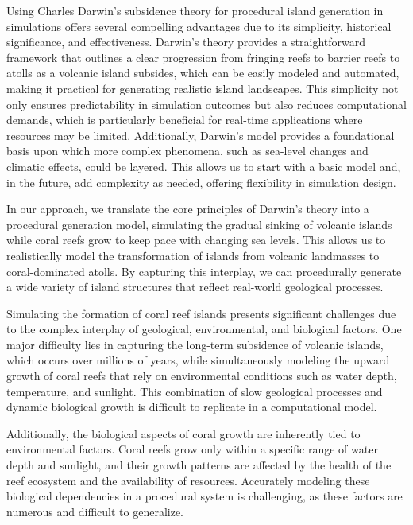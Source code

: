 Using Charles Darwin's subsidence theory for procedural island generation in simulations offers several compelling advantages due to its simplicity, historical significance, and effectiveness. Darwin's theory provides a straightforward framework that outlines a clear progression from fringing reefs to barrier reefs to atolls as a volcanic island subsides, which can be easily modeled and automated, making it practical for generating realistic island landscapes. This simplicity not only ensures predictability in simulation outcomes but also reduces computational demands, which is particularly beneficial for real-time applications where resources may be limited.
Additionally, Darwin's model provides a foundational basis upon which more complex phenomena, such as sea-level changes and climatic effects, could be layered. This allows us to start with a basic model and, in the future, add complexity as needed, offering flexibility in simulation design. 

In our approach, we translate the core principles of Darwin's theory into a procedural generation model, simulating the gradual sinking of volcanic islands while coral reefs grow to keep pace with changing sea levels. This allows us to realistically model the transformation of islands from volcanic landmasses to coral-dominated atolls. By capturing this interplay, we can procedurally generate a wide variety of island structures that reflect real-world geological processes.

%

Simulating the formation of coral reef islands presents significant challenges due to the complex interplay of geological, environmental, and biological factors. One major difficulty lies in capturing the long-term subsidence of volcanic islands, which occurs over millions of years, while simultaneously modeling the upward growth of coral reefs that rely on environmental conditions such as water depth, temperature, and sunlight. This combination of slow geological processes and dynamic biological growth is difficult to replicate in a computational model.

Additionally, the biological aspects of coral growth are inherently tied to environmental factors. Coral reefs grow only within a specific range of water depth and sunlight, and their growth patterns are affected by the health of the reef ecosystem and the availability of resources. Accurately modeling these biological dependencies in a procedural system is challenging, as these factors are numerous and difficult to generalize.

